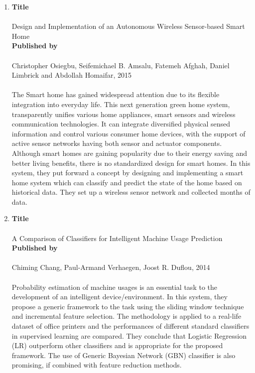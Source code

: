 \begin{enumerate}
	\item
		\textbf{Title}
			\paragraph{}Design and Implementation of an Autonomous Wireless Sensor-based Smart Home\\
		
		\textbf{Published by}
			\paragraph{}Christopher Osiegbu, Seifemichael B. Amsalu, Fatemeh Afghah, Daniel Limbrick and Abdollah Homaifar, 2015
			\paragraph{}The Smart home has gained widespread attention due to its flexible integration into everyday life. This next generation green home system, transparently unifies various home appliances, smart sensors and wireless communication technologies. It can integrate diversified physical sensed information and control various consumer home devices, with the support of active sensor networks having both sensor and actuator components. Although smart homes are gaining popularity due to their energy saving and better living benefits, there is no standardized design for smart homes. In this system, they put forward a concept by designing and implementing a smart home system which can classify and predict the state of the home based on historical data. They set up a wireless sensor network and collected months of data.\\

	\item
		\textbf{Title}
			\paragraph{}A Comparison of Classifiers for Intelligent Machine Usage Prediction\\
		
		\textbf{Published by}
			\paragraph{}Chiming Chang, Paul-Armand Verhaegen, Joost R. Duflou, 2014
			\paragraph{}Probability estimation of machine usages is an essential task to the development of an intelligent device/environment. In this system, they propose a generic framework to the task using the sliding window technique and incremental feature selection. The methodology is applied to a real-life dataset of office printers and the performances of different standard classifiers in supervised learning are compared. They conclude that Logistic Regression (LR) outperform other classifiers and is appropriate for the proposed framework. The use of Generic Bayesian Network (GBN) classifier is also promising, if combined with feature reduction methods.\\


\end{enumerate}
